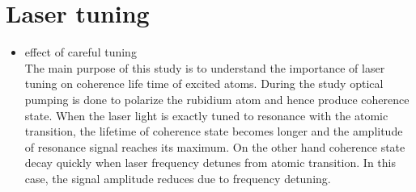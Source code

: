    \section{Laser tuning} 
   \begin{itemize}
   \item effect of careful tuning\\
	The main purpose of this study is to understand the importance of laser tuning on coherence life time of excited atoms. During the study optical pumping is done to polarize the rubidium atom and hence produce coherence state. When the laser light  is  exactly tuned to resonance with the atomic transition, the lifetime of coherence state becomes longer and the amplitude of resonance signal reaches its maximum. On the other hand coherence state decay  quickly when laser frequency detunes from atomic transition. In this case, the signal amplitude reduces due to frequency detuning.
	 \begin{figure}
    \centering
 

\end{figure}
\end{itemize}
